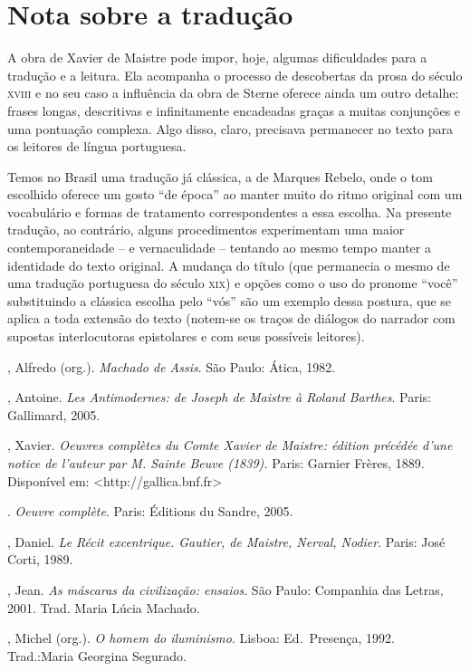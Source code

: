 \section{Nota sobre a tradução}

A obra de Xavier de Maistre pode impor, hoje, algumas dificuldades 
para a tradução e a leitura. Ela acompanha o processo de descobertas da 
prosa do século \textsc{xviii} e no seu caso a influência da obra de Sterne oferece 
ainda um outro detalhe: frases longas, descritivas e infinitamente encadeadas 
graças a muitas conjunções e uma pontuação complexa. Algo disso, claro, precisava 
permanecer no texto para os leitores de língua portuguesa.
	
Temos no Brasil uma tradução já clássica, a de Marques Rebelo, onde o tom escolhido 
oferece um gosto ``de época'' ao manter muito do ritmo original com um vocabulário e 
formas de tratamento correspondentes a essa escolha. Na presente tradução, ao contrário, 
alguns procedimentos experimentam uma maior contemporaneidade -- e vernaculidade -- tentando 
ao mesmo tempo manter a identidade do texto original. A mudança do título (que permanecia o 
mesmo de uma tradução portuguesa do século \textsc{xix}) e opções como o uso do pronome ``você'' 
substituindo a clássica escolha pelo ``vós'' são um exemplo dessa postura, que se aplica a 
toda extensão do texto (notem-se os traços de diálogos do narrador com supostas interlocutoras 
epistolares e com seus possíveis leitores). 

\begin{bibliohedra}
\vspace{2ex}

, Alfredo (org.). \textit{Machado de Assis}. São Paulo: Ática, 1982.

, Antoine. \textit{Les Antimodernes: de Joseph de Maistre à
Roland Barthes}. Paris: Gallimard, 2005.

, Xavier. \textit{Oeuvres complètes du Comte Xavier de Maistre:
édition précédée d’une notice de l’auteur par M. Sainte Beuve (1839).}
Paris: Garnier Frères, 1889. Disponível em: <http://gallica.bnf.fr> 

\tit{--------}. \textit{Oeuvre complète}. Paris: Éditions du Sandre,
2005.

, Daniel. \textit{Le Récit excentrique. Gautier, de Maistre,
Nerval, Nodier}. Paris: José Corti, 1989. 

, Jean. \textit{As máscaras da civilização: ensaios}. São
Paulo: Companhia das Letras, 2001. Trad. Maria Lúcia Machado. 

, Michel (org.). \textit{O homem do iluminismo}. Lisboa: 
Ed.~Presença, 1992. Trad.:Maria Georgina Segurado.
\end{bibliohedra}



